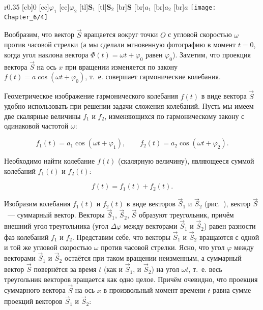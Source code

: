 \begin{wrapfigure}[]{r}{0.35\textwidth}
	[cb]{0}
	[cc]{$\varphi_1$}
	[cc]{$\varphi_2$}
	[tl]{$\mathbf{S}_1$}
	[tl]{$\mathbf{S}_2$}
	[br]{$\mathbf{S}$}
	[br]{$a_1$}
	[br]{$a_2$}
	[br]{$a$}
	\texttt{[image: Chapter\_6/4]}
	\caption{}
\end{wrapfigure}

Вообразим, что вектор $\vec{S}$ вращается вокруг точки $O$ с угловой скоростью $\omega$ против часовой стрелки (а мы
сделали мгновенную фотографию в момент $t=0$, когда угол наклона вектора $\Phi(t)=\omega t + \varphi_0$ равен $\varphi_0$).
Заметим, что проекция вектора $\vec{S}$ на ось $x$ при вращении изменяется по закону $f(t)=a\cos(\omega t+\varphi_0)$, т.~е.
совершает гармонические колебания.

Геометрическое изображение гармонического колебания $f(t)$ в виде вектора $\vec{S}$ удобно использовать при решении задачи
сложения колебаний. Пусть мы имеем две скалярные величины $f_1$ и $f_2$, изменяющихся по гармоническому закону с
одинаковой частотой $\omega$:

\begin{equation*}
	f_1(t)=a_1\cos(\omega t+\varphi_1), \qquad f_2(t)=a_2\cos(\omega t+\varphi_2).
\end{equation*}

Необходимо найти колебание $f(t)$ (скалярную величину), являющееся суммой колебаний $f_1(t)$ и $f_2(t)$:

\begin{equation*}
	f(t)=f_1(t)+f_2(t).
\end{equation*}

Изобразим колебания $f_1(t)$ и $f_2(t)$ в виде векторов $\vec{S}_1$ и $\vec{S}_2$ (рис.~), вектор $\vec{S}$~--- суммарный вектор.
Векторы $\vec{S}_1$, $\vec{S}_2$, $\vec{S}$ образуют треугольник, причём внешний угол треугольника (угол $\Delta\varphi$ между
векторами $\vec{S}_1$ и $\vec{S}_2$) равен разности фаз колебаний $f_1$ и $f_2$. Представим себе, что векторы $\vec{S}_1$ и
$\vec{S}_2$ вращаются с одной и той же угловой скоростью $\omega$ против часовой стрелки. Ясно, что угол $\varphi$ между
векторами $\vec{S}_1$ и $\vec{S}_2$ остаётся при таком вращении неизменным, а суммарный вектор $\vec{S}$ повернётся за время
$t$ (как и $\vec{S}_1$, и $\vec{S}_2$) на угол $\omega t$, т.~е. весь треугольник векторов вращается как одно целое. Причём
очевидно, что проекция суммарного вектора $\vec{S}$ на ось $x$ в произвольный момент времени $t$ равна сумме проекций
векторов $\vec{S}_1$ и $\vec{S}_2$:

